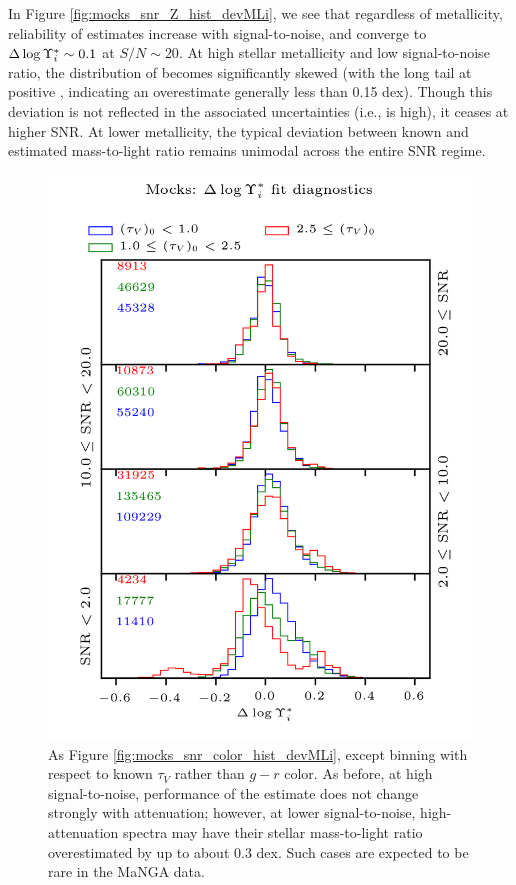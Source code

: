 In Figure \ref{fig:mocks_snr_Z_hist_devMLi}, we see that regardless of metallicity, reliability of  estimates increase with signal-to-noise, and converge to $\Delta \log \Upsilon^*_{i} \sim 0.1$ at $S/N \sim 20$. At high stellar metallicity and low signal-to-noise ratio, the distribution of  becomes significantly skewed (with the long tail at positive , indicating an overestimate generally less than 0.15 dex). Though this deviation is not reflected in the associated uncertainties (i.e.,  is high), it ceases at higher SNR. At lower metallicity, the typical deviation between known and estimated mass-to-light ratio remains unimodal across the entire SNR regime.

\begin{figure}
    \centering
    \includegraphics{mocks_snr_tauV_hist_devMLi}
    \caption[As Figure \ref{fig:mocks_snr_color_hist_devMLi}, except binning with respect to known $\tau_V$]{\fixspacing As Figure \ref{fig:mocks_snr_color_hist_devMLi}, except binning with respect to known $\tau_V$ rather than $g-r$ color. As before, at high signal-to-noise, performance of the  estimate does not change strongly with attenuation; however, at lower signal-to-noise, high-attenuation spectra may have their stellar mass-to-light ratio overestimated by up to about 0.3 dex. Such cases are expected to be rare in the MaNGA data.}
    \label{fig:mocks_snr_tauV_hist_devMLi}
\end{figure}

